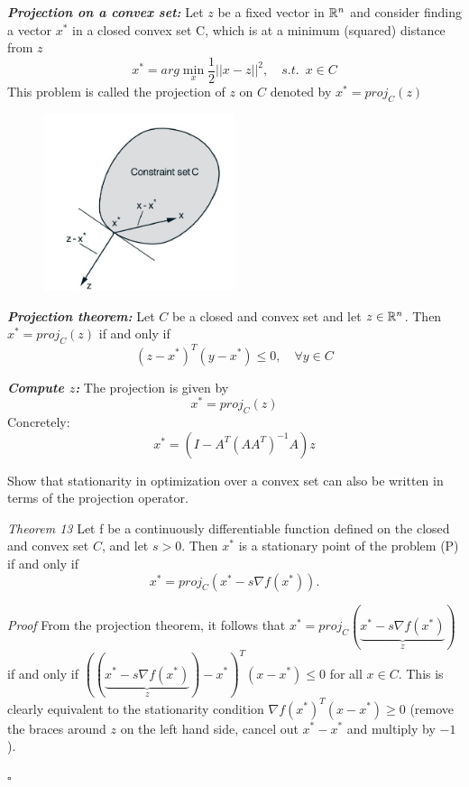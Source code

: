 \documentclass[12pt,a4paper]{article}
\begin{document}
\textbf{\textit{Projection on a convex set:}}
		Let $z$ be a fixed vector in $\mathbb{R}^n$ and consider finding a vector $x^{*}$ in a closed convex set C, which is at a minimum (squared) distance from $z$
		$$ x^{*} = arg \min_x \frac{1}{2} ||x- z ||^2, \quad s.t. \enspace x \in C$$		
		This problem is called the projection of $z$ on $C$ denoted by $x^{*} = proj_C(z)$ 	
		\begin{figure}[H]
			\centering
			\includegraphics[width=0.5\textwidth]{figures/proj_C.jpg}
		\end{figure}
		
	\textbf{\textit{Projection theorem:}} Let $C$ be a closed and convex set and let $z \in \mathbb{R}^n$. Then $x^{*}= proj_C(z)$ if and only if
		$$(z-x^{*})^T (y -x^{*}) \le 0, \quad \forall y \in C $$
	
	\textbf{\textit{Compute $z$:}}
	The projection is given by
	\begin{equation*}
	    x^* = proj_C(z)
	\end{equation*}
	Concretely:
	\begin{equation*}
	    x^* = (I - A^T(AA^T)^{-1} A) z
	\end{equation*}


\begin{question}
Show that stationarity in optimization over a convex set can also be written in terms of the projection operator.
\end{question}

\textit{Theorem 13} Let f be a continuously differentiable function defined on the closed and convex set
$C$, and let $s > 0$. Then $x^*$ is a stationary point of the problem (P) if and only if
$$x^* = proj_C(x^* - s\nabla f(x^*)).$$

\textit{Proof} From the projection theorem, it follows that 
$x^* = proj_C (\underbrace{x^* - s\nabla f (x^*)}_{z})$ if and only if
$((\underbrace{x^* - s\nabla f (x^*)}_{z}) - x^* )^T (x - x^* ) \leq 0$ for all $x \in C$. This is clearly equivalent to the stationarity condition $\nabla f (x^*)^T (x - x^* ) \geq 0$ (remove the braces around $z$ on the left hand side, cancel out $x^* - x^*$ and multiply by $-1$).
  \begin{flushright}
    $\square$
  \end{flushright}
\end{document}
